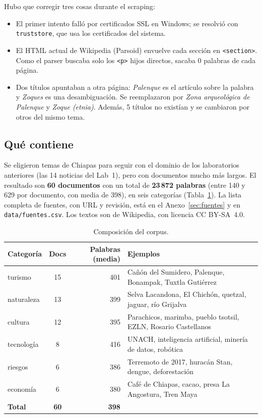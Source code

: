 \documentclass[11pt,letterpaper]{article}
\newcommand{\term}[1]{\texttt{#1}}
\begin{document}
Hubo que corregir tres cosas durante el scraping:
\begin{itemize}[nosep]
\item El primer intento falló por certificados SSL en Windows; se resolvió con \term{truststore}, que usa los certificados del sistema.
\item El HTML actual de Wikipedia (Parsoid) envuelve cada sección en \term{<section>}. Como el parser buscaba solo los \term{<p>} hijos directos, sacaba 0 palabras de cada página.
\item Dos títulos apuntaban a otra página: \emph{Palenque} es el artículo sobre la palabra y \emph{Zoques} es una desambiguación. Se reemplazaron por \emph{Zona arqueológica de Palenque} y \emph{Zoque (etnia)}. Además, 5 títulos no existían y se cambiaron por otros del mismo tema.
\end{itemize}

\subsection{Qué contiene}

Se eligieron temas de Chiapas para seguir con el dominio de los laboratorios anteriores (las 14 noticias del Lab~1), pero con documentos mucho más largos. El resultado son \textbf{60 documentos} con un total de \textbf{23\,872 palabras} (entre 140 y 629 por documento, con media de 398), en seis categorías (Tabla~\ref{tab:corpus}). La lista completa de fuentes, con URL y revisión, está en el Anexo~\ref{sec:fuentes} y en \term{data/fuentes.csv}. Los textos son de Wikipedia, con licencia CC BY-SA~4.0.

\begin{table}[H]
\centering
\caption{Composición del corpus.}
\label{tab:corpus}
\small
\begin{tabularx}{\linewidth}{lcrX}
\toprule
Categoría & Docs & Palabras (media) & Ejemplos \\
\midrule
turismo & 15 & 401 & Cañón del Sumidero, Palenque, Bonampak, Tuxtla Gutiérrez \\
naturaleza & 13 & 399 & Selva Lacandona, El Chichón, quetzal, jaguar, río Grijalva \\
cultura & 12 & 395 & Parachicos, marimba, pueblo tsotsil, EZLN, Rosario Castellanos \\
tecnología & 8 & 416 & UNACH, inteligencia artificial, minería de datos, robótica \\
riesgos & 6 & 386 & Terremoto de 2017, huracán Stan, dengue, deforestación \\
economía & 6 & 380 & Café de Chiapas, cacao, presa La Angostura, Tren Maya \\
\midrule
\textbf{Total} & \textbf{60} & \textbf{398} & \\
\bottomrule
\end{tabularx}
\end{table}
\end{document}
